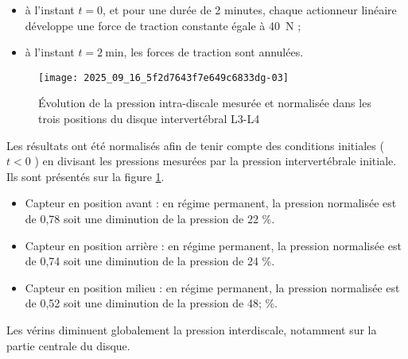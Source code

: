 \begin{itemize}
  \item à l'instant $t=0$, et pour une durée de 2 minutes, chaque actionneur linéaire développe une force de traction constante égale à \SI{40}{N} ;
  \item à l'instant $t=2 \mathrm{~min}$, les forces de traction sont annulées.
\end{itemize}


\begin{figure}[!h]
\centering
\texttt{[image: 2025\_09\_16\_5f2d7643f7e649c6833dg-03]}
\caption{\label{ccs_mp_2023_fig_04}  Évolution de la pression intra-discale mesurée et normalisée dans les trois positions du disque intervertébral L3-L4}
\end{figure}



Les résultats ont été normalisés afin de tenir compte des conditions initiales ( $t<0$ ) en divisant les pressions mesurées par la pression intervertébrale initiale. Ils sont présentés sur la figure \ref{ccs_mp_2023_fig_04}.

\ifprof
\begin{corrige}
\begin{itemize}
\item Capteur en position avant : en régime permanent, la pression normalisée est de 0,78 soit une diminution de la pression de 22\; \%.
\item Capteur en position arrière : en régime permanent, la pression normalisée est de 0,74 soit une diminution de la pression de 24\; \%.
\item Capteur en position milieu : en régime permanent, la pression normalisée est de 0,52 soit une diminution de la pression de 48; \%.
\end{itemize}
Les vérins diminuent globalement la pression interdiscale, notamment sur la partie centrale du disque.
\end{corrige}
\else
\fi


